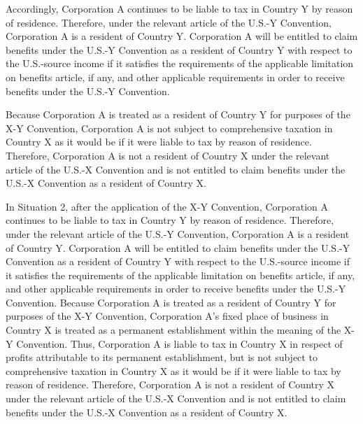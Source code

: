 \begin{select}
Accordingly, Corporation A continues to be liable to tax in Country Y by reason of residence. Therefore, under the relevant article of the U.S.-Y Convention, Corporation A is a resident of Country Y. Corporation A will be entitled to claim benefits under the U.S.-Y Convention as a resident of Country Y with respect to the U.S.-source income if it satisfies the requirements of the applicable limitation on benefits article, if any, and other applicable requirements in order to receive benefits under the U.S.-Y Convention. 

Because Corporation A is treated as a resident of Country Y for purposes of the X-Y Convention, Corporation A is not subject to comprehensive taxation in Country X as it would be if it were liable to 
tax by reason of residence. Therefore, Corporation A is not a resident of Country X under the relevant article of the U.S.-X Convention and is not entitled to claim benefits under the U.S.-X Convention as a resident of Country X. 

In Situation 2, after the application of the X-Y Convention, Corporation A continues to be liable to tax in Country Y by reason of residence. Therefore, under the relevant article of the U.S.-Y Convention, Corporation A is a resident of Country Y. Corporation A will be entitled to claim benefits under the U.S.-Y Convention as a resident of Country Y with respect to the U.S.-source income if it satisfies the requirements of the applicable limitation on benefits article, if any, and other applicable requirements in order to receive benefits under the U.S.-Y Convention. Because Corporation A is treated as a resident of Country Y for purposes of the X-Y Convention, Corporation A's fixed place of business in Country X is treated as a permanent establishment within the meaning of the X-Y Convention. Thus, Corporation A is liable to tax in Country X in respect of profits attributable to its permanent establishment, but is not subject to 
comprehensive taxation in Country X as it would be if it were liable to tax by reason of residence. Therefore, Corporation A is not a resident of Country X under the relevant article of the U.S.-X Convention and is not entitled to claim benefits under the U.S.-X Convention as a resident of Country X.


\end{select}

